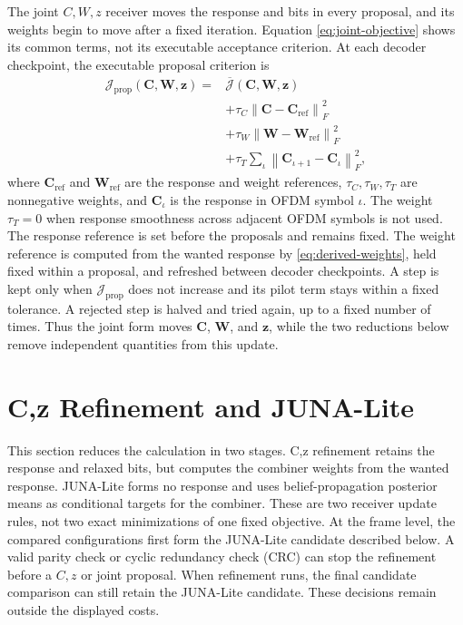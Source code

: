 \documentclass[conference]{IEEEtran}
\newcommand{\norm}[1]{\left\lVert #1\right\rVert}
\begin{document}
The joint \(C,W,z\) receiver moves the response and bits in every proposal,
and its weights begin to move after a fixed iteration.  Equation
\eqref{eq:joint-objective} shows its common terms, not its executable
acceptance criterion.  At each decoder checkpoint, the executable proposal
criterion is
\begin{equation}
  \begin{aligned}
    \mathcal J_{\mathrm{prop}}(\mathbf C,\mathbf W,\mathbf z)
    ={}&\overline{\mathcal J}(\mathbf C,\mathbf W,\mathbf z)\\
    &+\tau_C\norm{\mathbf C-\mathbf C_{\mathrm{ref}}}_F^2\\
    &+\tau_W\norm{\mathbf W-\mathbf W_{\mathrm{ref}}}_F^2\\
    &+\tau_T\sum_{\iota}
      \norm{\mathbf C_{\iota+1}-\mathbf C_{\iota}}_F^2,
  \end{aligned}
  \label{eq:proposal-objective}
\end{equation}
where \(\mathbf C_{\mathrm{ref}}\) and \(\mathbf W_{\mathrm{ref}}\) are
the response and weight references, \(\tau_C,\tau_W,\tau_T\) are nonnegative
weights, and \(\mathbf C_{\iota}\) is the response in OFDM symbol \(\iota\).
The weight \(\tau_T=0\) when response smoothness across adjacent OFDM symbols
is not used.  The response reference is set before the proposals and remains
fixed.  The weight reference is computed from the wanted response by
\eqref{eq:derived-weights}, held fixed within a proposal, and refreshed
between decoder checkpoints.  A step is kept only when
\(\mathcal J_{\mathrm{prop}}\) does not increase and its pilot term stays
within a fixed tolerance.  A rejected step is halved and tried again, up to a
fixed number of times.  Thus the joint form moves \(\mathbf C\), \(\mathbf W\),
and \(\mathbf z\), while the two reductions below remove independent
quantities from this update.

\section{C,z Refinement and JUNA-Lite}
\label{sec:reduced-receivers}

This section reduces the calculation in two stages.  C,z refinement retains
the response and relaxed bits, but computes the combiner weights from the
wanted response.  JUNA-Lite forms no response and uses belief-propagation
posterior means as conditional targets for the combiner.  These are two
receiver update rules, not two exact minimizations of one fixed objective.
At the frame level, the compared configurations first form the JUNA-Lite
candidate described below.  A valid parity check or cyclic redundancy check
(CRC) can stop the refinement before a \(C,z\) or joint proposal.  When
refinement runs, the final candidate comparison can still retain the
JUNA-Lite candidate.  These decisions remain outside the displayed costs.
\end{document}
